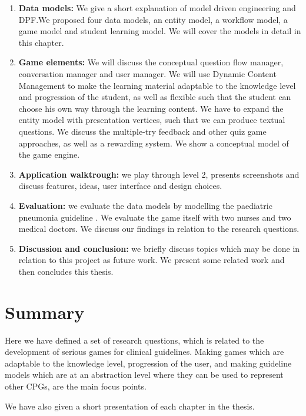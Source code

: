 \begin{enumerate}
	\item \textbf{Data models:} We give a short explanation of model driven engineering and DPF.We proposed four data models, an entity model, a workflow model, a game model and student learning model. We will cover the models in detail in this chapter.
	\item \textbf{Game elements:} We will discuss the conceptual question flow manager, conversation manager and user manager. We will use Dynamic Content Management to make the learning material adaptable to the knowledge level and progression of the student, as well as flexible such that the student can choose his own way through the learning content. We have to expand the entity model with presentation vertices, such that we can produce textual questions. We discuss the multiple-try feedback and other quiz game approaches, as well as a rewarding system. We show a conceptual model of the game engine.

	\item \textbf{Application walktrough:} we play through level 2, presents screenshots and discuss features, ideas, user interface and design choices.

	\item \textbf{Evaluation:} we evaluate the data models by modelling the paediatric pneumonia guideline \parencite{RepublicofKeny2016}. We evaluate the game itself with two nurses and two medical doctors. We discuss our findings in relation to the research questions.

	\item \textbf{Discussion and conclusion:} we briefly discuss topics which may be done in relation to this project as future work. We present some related work and then concludes this thesis.
\end{enumerate}
\section{Summary}
Here we have defined a set of research questions, which is related to the development of serious games for clinical guidelines. Making games which are adaptable to the knowledge level, progression of the user, and making guideline models which are at an abstraction level where they can be used to represent other CPGs, are the main focus points.

We have also given a short presentation of each chapter in the thesis.

